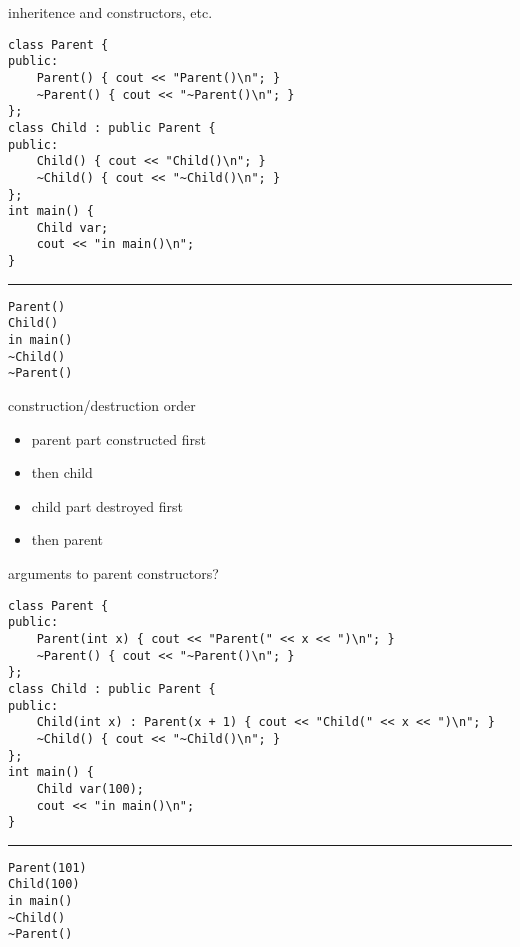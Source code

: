 \begin{frame}[fragile,label=inheritConstructDestruct]{inheritence and constructors, etc.}
\lstset{language=C++,style=script}
\vspace{-.5cm}
\begin{lstlisting}
class Parent {
public:
    Parent() { cout << "Parent()\n"; }
    ~Parent() { cout << "~Parent()\n"; }
};
class Child : public Parent {
public:
    Child() { cout << "Child()\n"; }
    ~Child() { cout << "~Child()\n"; }
};
int main() {
    Child var;
    cout << "in main()\n";
}
\end{lstlisting}
\hrule
\begin{Verbatim}[fontsize=\small]
Parent()
Child()
in main()
~Child()
~Parent()
\end{Verbatim}
\end{frame}

\begin{frame}{construction/destruction order}
\begin{itemize}
\item parent part constructed first
\item then child
\vspace{.5cm}
\item child part destroyed first
\item then parent
\end{itemize}
\end{frame}

\begin{frame}[fragile,label=constructArgs]{arguments to parent constructors?}
\lstset{language=C++,style=script}
\vspace{-.5cm}
\begin{lstlisting}
class Parent {
public:
    Parent(int x) { cout << "Parent(" << x << ")\n"; }
    ~Parent() { cout << "~Parent()\n"; }
};
class Child : public Parent {
public:
    Child(int x) : Parent(x + 1) { cout << "Child(" << x << ")\n"; }
    ~Child() { cout << "~Child()\n"; }
};
int main() {
    Child var(100);
    cout << "in main()\n";
}
\end{lstlisting}
\hrule
\begin{Verbatim}[fontsize=\small]
Parent(101)
Child(100)
in main()
~Child()
~Parent()
\end{Verbatim}
\end{frame}
